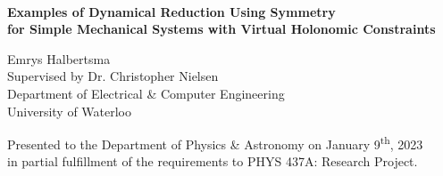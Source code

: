 \begin{titlepage}
\begin{center}
    \vspace*{90mm}
    \hrulefill\\
    \vspace{4mm}
    \Large{ 
           \textbf{
            {Examples of Dynamical Reduction Using Symmetry\\for Simple Mechanical Systems with Virtual Holonomic Constraints}
        }
    }
    \\\vspace{1mm}
    \hrulefill
\end{center}

\vspace*{35mm}

\begin{center}
    {
        \large{
            {Emrys Halbertsma}
        }
        \vspace{4mm}\\
	\large{
	    Supervised by Dr. Christopher Nielsen\\Department of Electrical \& Computer Engineering\\University of Waterloo}
    }
    
    \vspace{15mm}
    \large{
        Presented to the Department of Physics \& Astronomy 
        on January 9\textsuperscript{th}, 2023
        \\in partial fulfillment of the requirements to PHYS 437A: Research Project.
    }
\end{center}

\end{titlepage}

